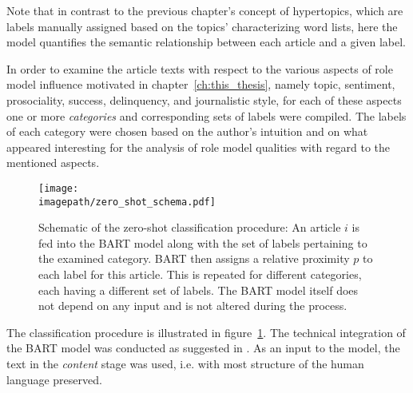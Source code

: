 Note that in contrast to the previous chapter's concept of hypertopics, which are labels manually assigned based on the topics' characterizing word lists, here the model quantifies the semantic relationship between each article and a given label.

In order to examine the article texts with respect to the various aspects of role model influence motivated in chapter~\ref{ch:this_thesis}, namely topic, sentiment, prosociality, success, delinquency, and journalistic style, for each of these aspects one or more \textit{categories} and corresponding sets of labels were compiled. The labels of each category were chosen based on the author's intuition and on what appeared interesting for the analysis of role model qualities with regard to the mentioned aspects.

\begin{figure}
    \centering
    \texttt{[image: \\imagepath/zero\_shot\_schema.pdf]}
    \caption{Schematic of the zero-shot classification procedure: An article $i$ is fed into the BART model along with the set of labels pertaining to the examined category. BART then assigns a relative proximity $p$ to each label for this article. This is repeated for different categories, each having a different set of labels. The BART model itself does not depend on any input and is not altered during the process.}\label{fig:zero_shot_schema}
\end{figure}

The classification procedure is illustrated in figure~\ref{fig:zero_shot_schema}. The technical integration of the BART model was conducted as suggested in \textcite{huggingfacebart-large-mnli_facebookbart-large-mnli_nodate}. As an input to the model, the text in the \textit{content} stage was used, i.e. with most structure of the human language preserved.


